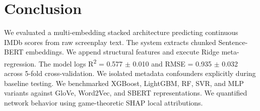 \documentclass[conference]{IEEEtran}
\begin{document}
\section{Conclusion}

We evaluated a multi-embedding stacked architecture predicting continuous IMDb scores from raw screenplay text. The system extracts chunked Sentence-BERT embeddings. We append structural features and execute Ridge meta-regression. The model logs R\textsuperscript{2} = 0.577 $\pm$ 0.010 and RMSE = 0.935 $\pm$ 0.032 across 5-fold cross-validation. We isolated metadata confounders explicitly during baseline testing. We benchmarked XGBoost, LightGBM, RF, SVR, and MLP variants against GloVe, Word2Vec, and SBERT representations. We quantified network behavior using game-theoretic SHAP local attributions.
\end{document}
